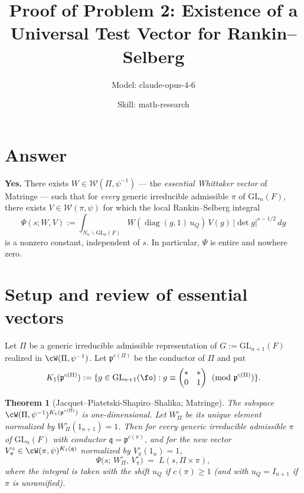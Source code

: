 

\title{Proof of Problem 2: Existence of a Universal Test Vector for Rankin--Selberg}
\author{Model: claude-opus-4-6 \and Skill: math-research}
\date{}

\newtheorem{theorem}{Theorem}
\newtheorem{lemma}[theorem]{Lemma}
\newtheorem{proposition}[theorem]{Proposition}


\maketitle

\section*{Answer}

\textbf{Yes.} There exists $W\in\mathcal W(\Pi,\psi^{-1})$ --- the \emph{essential Whittaker vector} of Matringe --- such that for \emph{every} generic irreducible admissible $\pi$ of $\mathrm{GL}_n(F)$, there exists $V\in\mathcal W(\pi,\psi)$ for which the local Rankin--Selberg integral
\[
   \Psi(s;W,V) := \int_{N_n\backslash \mathrm{GL}_n(F)} W(\operatorname{diag}(g,1)\,u_Q)\,V(g)\,|\det g|^{s-1/2}\,dg
\]
is a nonzero constant, independent of $s$. In particular, $\Psi$ is entire and nowhere zero.

\section{Setup and review of essential vectors}

Let $\Pi$ be a generic irreducible admissible representation of $G:=\mathrm{GL}_{n+1}(F)$ realized in $\cW(\Pi,\psi^{-1})$. Let $\mathfrak p^{c(\Pi)}$ be the conductor of $\Pi$ and put
\[
   K_1(\mathfrak p^{c(\Pi)}):=\{ g\in \mathrm{GL}_{n+1}(\fo) : g \equiv \begin{pmatrix} * & * \\ 0 & 1\end{pmatrix}\pmod{\mathfrak p^{c(\Pi)}}\}.
\]

\begin{theorem}[Jacquet--Piatetski-Shapiro--Shalika; Matringe]\label{thm:essential}
The subspace $\cW(\Pi,\psi^{-1})^{K_1(\mathfrak p^{c(\Pi)})}$ is one-dimensional. Let $W^\circ_\Pi$ be its unique element normalized by $W^\circ_\Pi(1_{n+1})=1$. Then for every generic irreducible admissible $\pi$ of $\mathrm{GL}_n(F)$ with conductor $\mathfrak q=\mathfrak p^{c(\pi)}$, and for the new vector $V^\circ_\pi\in\cW(\pi,\psi)^{K_1(\mathfrak q)}$ normalized by $V^\circ_\pi(1_n)=1$,
\begin{equation}\label{eq:matringe}
   \Psi\bigl(s;\,W^\circ_\Pi,\,V^\circ_\pi\bigr) \;=\; L(s,\Pi\times\pi),
\end{equation}
where the integral is taken with the shift $u_Q$ if $c(\pi)\geq 1$ (and with $u_Q=I_{n+1}$ if $\pi$ is unramified).
\end{theorem}

